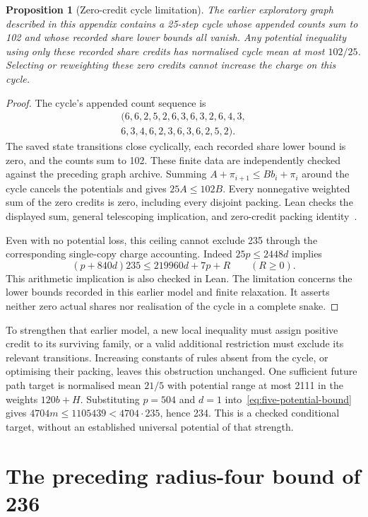 \documentclass[11pt,a4paper]{article}
\newtheorem{proposition}[theorem]{Proposition}
\theoremstyle{definition}
\theoremstyle{remark}
\begin{document}
\begin{proposition}[Zero-credit cycle limitation]\label{prop:zero-credit}
The earlier exploratory graph described in this appendix contains a 25-step cycle whose appended counts sum to 102 and whose recorded share lower bounds all vanish. Any potential inequality using only these recorded share credits has normalised cycle mean at most $102/25$. Selecting or reweighting these zero credits cannot increase the charge on this cycle.
\end{proposition}
\begin{proof}
The cycle's appended count sequence is
\[
\begin{gathered}
(6,6,2,5,2,6,3,6,3,2,6,4,3,\\
6,3,4,6,2,3,6,3,6,2,5,2).
\end{gathered}
\]
The saved state transitions close cyclically, each recorded share lower bound is zero, and the counts sum to 102. These finite data are independently checked against the preceding graph archive. Summing $A+\pi_{i+1}\le B b_i+\pi_i$ around the cycle cancels the potentials and gives $25A\le102B$. Every nonnegative weighted sum of the zero credits is zero, including every disjoint packing. Lean checks the displayed sum, general telescoping implication, and zero-credit packing identity~\cite{packingarchive}.

Even with no potential loss, this ceiling cannot exclude 235 through the corresponding single-copy charge accounting. Indeed $25p\le2448d$ implies
\[
(p+840d)235\le219960d+7p+R\qquad(R\ge0).
\]
This arithmetic implication is also checked in Lean. The limitation concerns the lower bounds recorded in this earlier model and finite relaxation. It asserts neither zero actual shares nor realisation of the cycle in a complete snake.
\end{proof}

To strengthen that earlier model, a new local inequality must assign positive credit to its surviving family, or a valid additional restriction must exclude its relevant transitions. Increasing constants of rules absent from the cycle, or optimising their packing, leaves this obstruction unchanged. One sufficient future path target is normalised mean $21/5$ with potential range at most 2111 in the weights $120b+H$. Substituting $p=504$ and $d=1$ into~\eqref{eq:five-potential-bound} gives $4704m\le1105439<4704\cdot235$, hence 234. This is a checked conditional target, without an established universal potential of that strength.


\section{The preceding radius-four bound of 236}\label{app:bound236}
\end{document}
